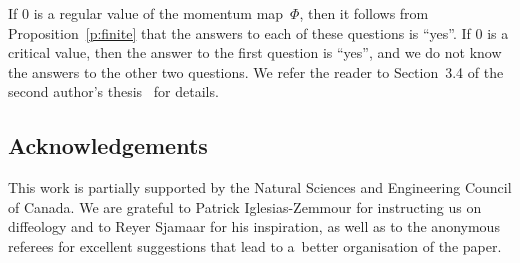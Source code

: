 \documentclass[pdftex]{sigma}
\numberwithin{equation}{section}
\newcommand{\hypref}[2]{{#2~\ref{#1}}}
\begin{document}
If $0$ is a regular value of the momentum map~$\Phi$,
then it follows from \hypref{p:finite}{Proposition}
that the answers to each of these questions is ``yes''.
If $0$ is a critical value, then the answer to the f\/irst question is ``yes'',
and we do not know the answers to the other two questions.
We refer the reader to Section~3.4 of the second author's thesis~\cite{watts}
for details.

\subsection*{Acknowledgements}
This work is partially supported by the Natural Sciences
and Engineering Council of Canada.
We are grateful to Patrick Iglesias-Zemmour for instructing us on dif\/feology
and to Reyer Sjamaar for his inspiration, as well as to the anonymous referees for excellent suggestions that lead to a~better organisation of the paper.
\end{document}
